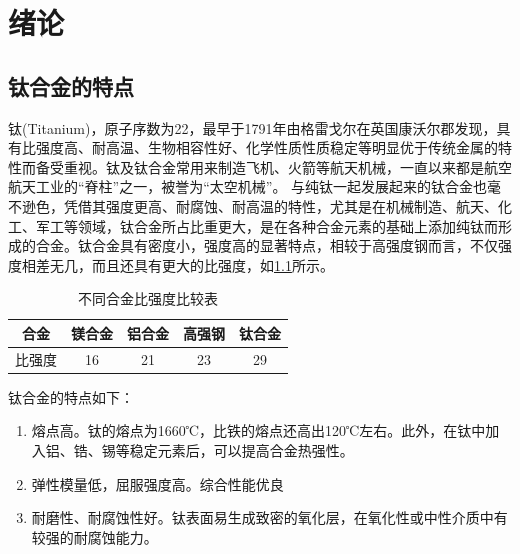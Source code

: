 \chapter{绪论}
\section{钛合金的特点}

钛(Titanium)，原子序数为22，最早于1791年由格雷戈尔在英国康沃尔郡发现，具有比强度高、耐高温、生物相容性好、化学性质性质稳定等明显优于传统金属的特性而备受重视。钛及钛合金常用来制造飞机、火箭等航天机械，一直以来都是航空航天工业的“脊柱”之一，被誉为“太空机械”\cite{XJYS200102014}。
与纯钛一起发展起来的钛合金也毫不逊色，凭借其强度更高、耐腐蚀、耐高温的特性，尤其是在机械制造、航天、化工、军工等领域，钛合金所占比重更大，是在各种合金元素的基础上添加纯钛而形成的合金\cite{HSJJ202109005}。钛合金具有密度小，强度高的显著特点，相较于高强度钢而言，不仅强度相差无几，而且还具有更大的比强度\cite{hardestyMetalsHandbookNinth1982}，如\ref{sec:bqd}所示。
\begin{table}[htbp]
	\centering
	\caption{不同合金比强度比较表}
		\label{sec:bqd}
	\begin{tabular}{ccccc}
		\toprule
		{合金} & {镁合金} & {铝合金} & {高强钢} & {钛合金} \\
		\midrule
		比强度 & 16 & 21 & 23 & 29 \\
		\bottomrule
	\end{tabular}
\end{table}

钛合金的特点如下\cite{1997titanium}：
\begin{enumerate}
	\item 熔点高。钛的熔点为1660℃，比铁的熔点还高出120℃左右。此外，在钛中加入铝、锆、锡等稳定元素后，可以提高合金热强性。
	\item 弹性模量低，屈服强度高。综合性能优良
	\item 耐磨性、耐腐蚀性好。钛表面易生成致密的氧化层，在氧化性或中性介质中有较强的耐腐蚀能力。
\end{enumerate}

